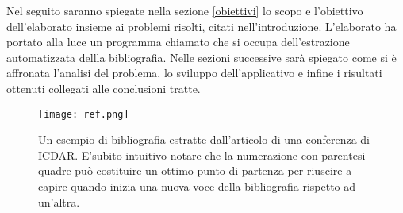 Nel seguito saranno spiegate nella sezione \ref{obiettivi} lo scopo e l'obiettivo dell'elaborato insieme ai problemi risolti, citati nell'introduzione. L'elaborato ha portato alla luce  un programma chiamato \textit{} che si occupa dell'estrazione automatizzata dellla bibliografia. Nelle sezioni successive sarà spiegato come si è affronata l'analisi del problema, lo sviluppo dell'applicativo e infine i risultati ottenuti collegati alle conclusioni tratte.


\begin{figure}[htb]
\begin{center}
\texttt{[image: ref.png]}
\end{center}
\caption[Un esempio di bibliografia]{Un esempio di bibliografia estratte dall'articolo di una conferenza di ICDAR. E'subito intuitivo notare che la numerazione con parentesi quadre può costituire un ottimo punto di partenza per riuscire a capire quando inizia una nuova voce della bibliografia rispetto ad un'altra.}
\label{fig:ref-examples}
\end{figure}



